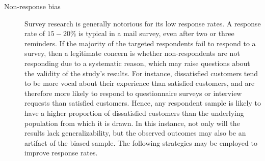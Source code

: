 \begin{description}
	\item[Non-response bias] Survey research is generally notorious for its low response rates. A response rate of $ 15-20\% $ is typical in a mail survey, even after two or three reminders. If the majority of the targeted respondents fail to respond to a survey, then a legitimate concern is whether non-respondents are not responding due to a systematic reason, which may raise questions about the validity of the study's results. For instance, dissatisfied customers tend to be more vocal about their experience than satisfied customers, and are therefore more likely to respond to questionnaire surveys or interview requests than satisfied customers. Hence, any respondent sample is likely to have a higher proportion of dissatisfied customers than the underlying population from which it is drawn. In this instance, not only will the results lack generalizability, but the observed outcomes may also be an artifact of the biased sample. The following strategies may be employed to improve response rates.


\end{description}
